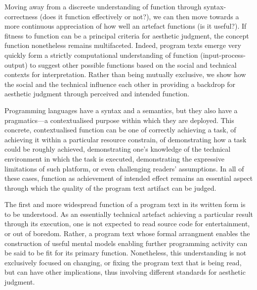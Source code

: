 Moving away from a discreete understanding of function through syntax-correctness (does it function effectively or not?), we can then move towards a more continuous appreciation of how well an artefact functions (is it useful?). If fitness to function can be a principal criteria for aesthetic judgment, the concept function nonetheless remains multifaceted. Indeed, program texts emerge very quickly form a strictly computational understanding of function (input-process-output) to suggest other possible functions based on the social and technical contexts for interpretation. Rather than being mutually exclusive, we show how the social and the technical influence each other in providing a backdrop for aesthetic judgment through perceived and intended function.

Programming languages have a syntax and a semantics, but they also have a pragmatics—a contextualised purpose within which they are deployed. This concrete, contextualised function can be one of correctly achieving a task, of achieving it within a particular resource constrain, of demonstrating how a task could be roughly achieved, demonstrating one's knowledge of the technical environment in which the task is executed, demonstrating the expressive limitations of such platform, or even challenging readers' assumptions. In all of these cases, function as achievement of intended effect remains an essential aspect through which the quality of the program text artifact can be judged.

The first and more widespread function of a program text in its written form is to be understood. As an essentially technical artefact achieving a particular result through its execution, one is not expected to read source code for entertainment, or out of boredom. Rather, a program text whose formal arrangment enables the construction of useful mental models enabling further programming activity can be said to be fit for its primary function. Nonetheless, this understanding is not exclusively focused on changing, or fixing the program text that is being read, but can have other implications, thus involving different standards for aesthetic judgment.

